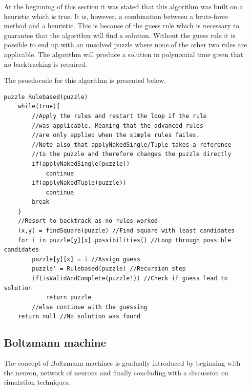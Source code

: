 \documentclass[a4paper,11pt]{kth-mag}
\begin{document}
At the beginning of this section it was stated that this algorithm was built on a heuristic which is true.
It is, however, a combination between a brute-force method and a heuristic.
This is because of the guess rule which is necessary to guarantee that the algorithm will find a solution.
Without the guess rule it is possible to end up with an unsolved puzzle where none of the other two rules are applicable.
The algorithm will produce a solution in polynomial time given that no backtracking is required.

The psuedocode for this algorithm is presented below.
\begin{verbatim}
puzzle Rulebased(puzzle)
    while(true){
        //Apply the rules and restart the loop if the rule
        //was applicable. Meaning that the advanced rules
        //are only applied when the simple rules failes.
        //Note also that applyNakedSingle/Tuple takes a reference
        //to the puzzle and therefore changes the puzzle directly
        if(applyNakedSingle(puzzle))
            continue
        if(applyNakedTuple(puzzle))
            continue
        break
    }
    //Resort to backtrack as no rules worked
    (x,y) = findSquare(puzzle) //Find square with least candidates
    for i in puzzle[y][x].possibilities() //Loop through possible candidates
        puzzle[y][x] = i //Assign guess
        puzzle' = Rulebased(puzzle) //Recursion step 
        if(isValidAndComplete(puzzle')) //Check if guess lead to solution
            return puzzle'
        //else continue with the guessing
    return null //No solution was found
\end{verbatim}

\FloatBarrier
\subsection{Boltzmann machine}
\label{sec:boltzmannBackground}
The concept of Boltzmann machines is gradually introduced by beginning with the neuron, 
network of neurons and finally concluding with a discussion on simulation techniques.\\
\end{document}
